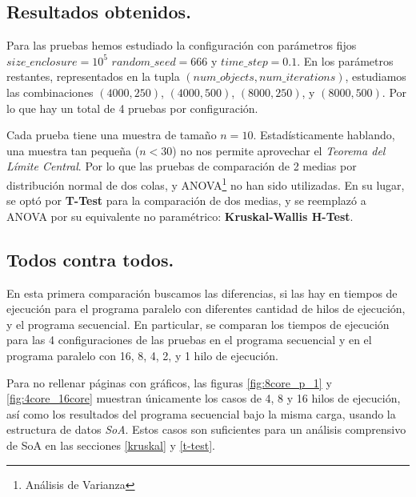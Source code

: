 \documentclass{article}
\begin{document}
\subsection{Resultados obtenidos.}
Para las pruebas hemos estudiado la configuración con parámetros fijos ${size\_enclosure}=10^5$ ${random\_seed}=666$ y
${time\_step}=0.1$. En los parámetros restantes, representados en la tupla $({num\_objects}, {num\_iterations})$,
estudiamos las combinaciones $(4000, 250)$, $(4000, 500)$, $(8000, 250)$, y $(8000, 500)$. Por lo que hay
un total de 4 pruebas por configuración.

Cada prueba tiene una muestra de tamaño ${n}=10$. Estadísticamente
hablando, una muestra tan pequeña ($n < 30$) no nos permite aprovechar el \textit{Teorema del Límite Central}.
Por lo que las pruebas de comparación de 2 medias por distribución normal de dos colas, y ANOVA\footnote{Análisis de Varianza}
no han sido utilizadas. En su lugar, se optó por \textbf{T-Test} para la comparación de dos medias, y se reemplazó a ANOVA
por su equivalente no paramétrico: \textbf{Kruskal-Wallis H-Test}.

\subsection{Todos contra todos.\label{kruskal}}
En esta primera comparación buscamos las diferencias, si las hay en tiempos de ejecución para el programa
paralelo con diferentes cantidad de hilos de ejecución, y el programa secuencial. En particular, se comparan
los tiempos de ejecución para las 4 configuraciones de las pruebas en el programa secuencial y en el programa paralelo
con 16, 8, 4, 2, y 1 hilo de ejecución.


Para no rellenar páginas con gráficos, las figuras \ref{fig:8core_p_1} y \ref{fig:4core_16core} muestran únicamente los casos de 4, 8 y 16 hilos de ejecución, así como los resultados del programa
secuencial bajo la misma carga, usando la estructura de datos \textit{SoA}. Estos casos son suficientes
para un análisis comprensivo de SoA en las secciones \ref{kruskal} y \ref{t-test}.
\end{document}
